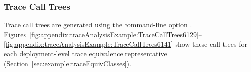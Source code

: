 \subsubsection{Trace Call Trees}\label{sec:example:traceCallTrees}%

\enlargethispage{1.2cm}

Trace call trees are generated using the command-line option \OPT{\OPTplotCallTrees}. %
Figures~\ref{fig:appendix:traceAnalysisExample:TraceCallTrees6129}--\ref{fig:appendix:traceAnalysisExample:TraceCallTrees6141} %
show these call trees for each deployment-level %
trace equivalence representative (Section~\ref{sec:example:traceEquivClasses}).

\begin{figure}[h]\centering
{}
\end{figure}
